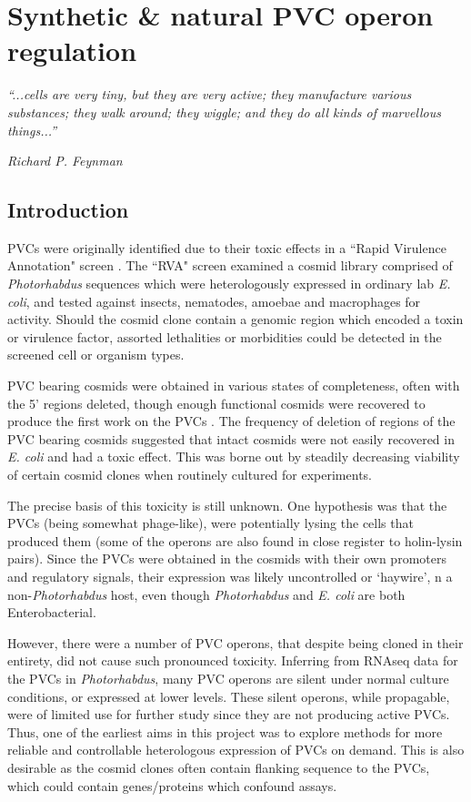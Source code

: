 \pagestyle{IHA-fancy-style}


\chapter{Synthetic \& natural PVC operon regulation}\label{regulation}

\epigraph{\emph{``...cells are very tiny, but they are very active; they manufacture various substances; they walk around; they wiggle; and they do all kinds of marvellous things...''}}{\textit{Richard P. Feynman}}

\section{Introduction}
PVCs were originally identified due to their toxic effects in a ``Rapid Virulence Annotation" screen \citep{Waterfield2008, Yang2006}. The ``RVA" screen examined a cosmid library comprised of \emph{Photorhabdus} sequences which were heterologously expressed in ordinary lab \emph{E. coli},  and tested against insects, nematodes, amoebae and macrophages for activity. Should the cosmid clone contain a genomic region which encoded a toxin or virulence factor, assorted lethalities or morbidities could be detected in the screened cell or organism types.

PVC bearing cosmids were obtained in various states of completeness, often with the 5' regions deleted, though enough functional cosmids were recovered to produce the first work on the PVCs \citep{Yang2006}. The frequency of deletion of regions of the PVC bearing cosmids suggested that intact cosmids were not easily recovered in \emph{E. coli} and had a toxic effect. This was borne out by steadily decreasing viability of certain cosmid clones when routinely cultured for experiments.

The precise basis of this toxicity is still unknown. One hypothesis was that the PVCs (being somewhat phage-like), were potentially lysing the cells that produced them (some of the operons are also found in close register to holin-lysin pairs). Since the PVCs were obtained in the cosmids with their own promoters and regulatory signals, their expression was likely uncontrolled or `haywire', n a non-\emph{Photorhabdus} host, even though \emph{Photorhabdus} and \emph{E. coli} are both Enterobacterial.

However, there were a number of PVC operons, that despite being cloned in their entirety, did not cause such pronounced toxicity. Inferring from RNAseq data for the PVCs in \emph{Photorhabdus}, many PVC operons are silent under normal culture conditions, or expressed at lower levels. These silent operons, while propagable, were of limited use for further study since they are not producing active PVCs. Thus, one of the earliest aims in this project was to explore methods for more reliable and controllable heterologous expression of PVCs on demand. This is also desirable as the cosmid clones often contain flanking sequence to the PVCs, which could contain genes/proteins which confound assays.

